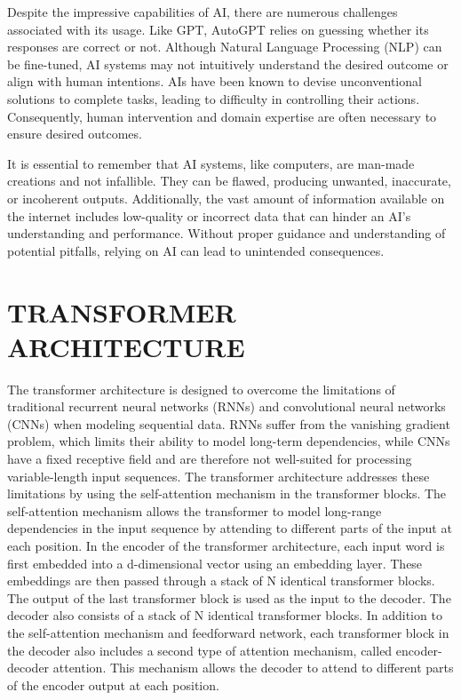\documentclass[letterpaper, 10pt, conference]{ieeeconf}
\begin{document}
        Despite the impressive capabilities of AI, there are numerous challenges associated with its usage. Like GPT, AutoGPT relies on guessing whether its responses are correct or not. Although Natural Language Processing (NLP) can be fine-tuned, AI systems may not intuitively understand the desired outcome or align with human intentions. AIs have been known to devise unconventional solutions to complete tasks, leading to difficulty in controlling their actions. Consequently, human intervention and domain expertise are often necessary to ensure desired outcomes\cite{miles2022}.
        
        It is essential to remember that AI systems, like computers, are man-made creations and not infallible. They can be flawed, producing unwanted, inaccurate, or incoherent outputs. Additionally, the vast amount of information available on the internet includes low-quality or incorrect data that can hinder an AI's understanding and performance. Without proper guidance and understanding of potential pitfalls, relying on AI can lead to unintended consequences.


    \section{TRANSFORMER ARCHITECTURE}

    The transformer architecture is designed to overcome the limitations of traditional recurrent neural networks (RNNs) and
    convolutional neural networks (CNNs) when modeling sequential data. RNNs suffer from the vanishing gradient problem, which
    limits their ability to model long-term dependencies, while CNNs have a fixed receptive field and are therefore not well-suited for
    processing variable-length input sequences.
    The transformer architecture addresses these limitations by using the self-attention mechanism in the transformer blocks.
    The self-attention mechanism allows the transformer to model long-range dependencies in the input sequence by attending to
    different parts of the input at each position.
    In the encoder of the transformer architecture, each input word is first embedded into a d-dimensional vector using an
    embedding layer. These embeddings are then passed through a stack of N identical transformer blocks. The output of the last
    transformer block is used as the input to the decoder.
    The decoder also consists of a stack of N identical transformer blocks. In addition to the self-attention mechanism and
    feedforward network, each transformer block in the decoder also includes a second type of attention mechanism, called encoder-decoder attention. This mechanism allows the decoder to attend to different parts of the encoder output at each position.
       
\end{document}
